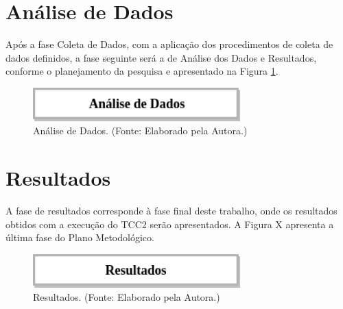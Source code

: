 \section{Análise de Dados}

Após a fase Coleta de Dados, com a aplicação dos procedimentos de coleta de dados definidos, a fase seguinte será a de Análise dos Dados e Resultados, conforme o planejamento da pesquisa e apresentado na Figura \ref{fig:analiseDados}.

        \begin{figure}[H]
          \centering
          \includegraphics[width=8cm]{figuras/analiseDados.png}
          \caption{Análise de Dados. (Fonte: Elaborado pela Autora.)} 
          \label{fig:analiseDados}
        
        \end{figure}
        
\section{Resultados}

A fase de resultados corresponde à fase final deste trabalho, onde os resultados obtidos com a execução do TCC2 serão apresentados. A Figura X apresenta a última fase do Plano Metodológico.

        \begin{figure}[H]
          \centering
          \includegraphics[width=8cm]{figuras/resultados.png}
          \caption{Resultados. (Fonte: Elaborado pela Autora.)} 
          \label{fig:resultados}
        
        \end{figure}
